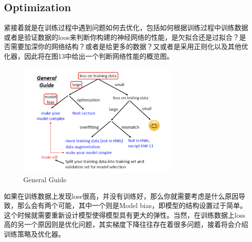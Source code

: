 \documentclass{article}
\begin{document}
\subsection{Optimization}
\indent 紧接着就是在训练过程中遇到问题如何去优化，包括如何根据训练过程中训练数据或者是验证数据的loos来判断你构建的神经网络的性能，是欠拟合还是过拟合？是否需要加深你的网络结构？或者是给更多的数据？又或者是采用正则化以及其他优化器，因此将在图13中给出一个判断网络性能的概览图。
\begin{figure}[H]
    \centering
    \includegraphics[width=8cm]{picture/General_Guide.png}
    \caption{General Guide}
    \label{fig:galxy}
\end{figure}
\indent 如果在训练数据上发现loss很高，并没有训练好，那么你就需要考虑是什么原因导致，那么会有两个可能，其中一个则是Model bias，即模型的结构设置过于简单。这个时候就需要重新设计模型使得模型具有更大的弹性。当然，在训练数据上loss高的另一个原因则是优化问题，其实梯度下降往往存在着很多问题，接着将会介绍训练策略及优化器。\par
\end{document}
